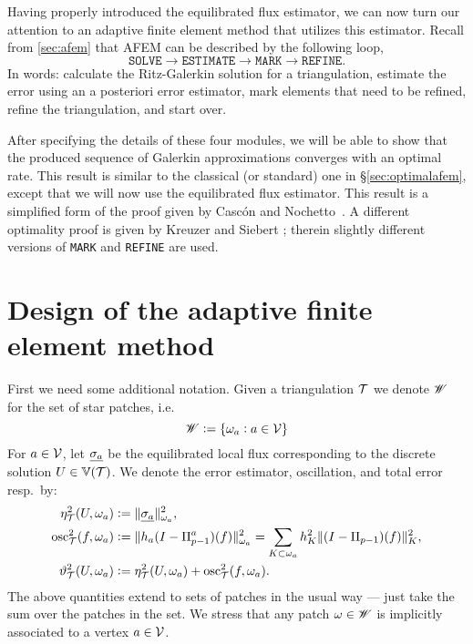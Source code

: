 \documentclass[thesis.tex]{subfiles}
\begin{document}
Having properly introduced the equilibrated flux estimator, we can now turn our attention
to an adaptive finite element method that utilizes this estimator.
Recall from \ref{sec:afem} that AFEM can be described by the following loop,
\[
  \texttt{SOLVE} \to \texttt{ESTIMATE} \to \texttt{MARK} \to \texttt{REFINE}.
\]
In words: calculate the Ritz-Galerkin solution for a triangulation, estimate
the error using an a posteriori error estimator, mark elements that need to be refined, refine
the triangulation, and start over. 

After specifying the details of these four modules, we will be able to show that the produced
sequence of Galerkin approximations converges with an optimal rate. This result
is similar to the classical (or standard) one in \S\ref{sec:optimalafem}, except that we will now use the equilibrated flux estimator. This
result is a simplified form of the proof given by Casc\'on and Nochetto~\cite{cascon2012}.
A different optimality proof is given by Kreuzer and Siebert \cite{kreuzersiebert}; therein
slightly different versions of \texttt{MARK} and \texttt{REFINE} are used.

\section{Design of the adaptive finite element method}
First we need some additional notation. Given a triangulation $\mathcal{T}$ we denote $\mathscr{W}$ for the set of star patches, i.e.~
\[
  \mathscr{W} := \set{\omega_a : a \in \mathcal{V}}
\]
For $a \in \mathcal{V}$, let $\underline{\sigma_a}$ be the equilibrated local flux corresponding to the discrete solution $U \in \mathbb{V}(\mathcal{T})$. We denote the
  error estimator, oscillation, and total error resp.~by:
\begin{align*}
  \eta^2_{\mathcal{T}}(U, \omega_a) &:= \| \underline{\sigma_a} \|^2_{\omega_a}, \\
  \operatorname{osc}^2_{\mathcal{T}}(f, \omega_a) &:= \| h_a(I - \Pi_{p-1}^a)(f) \|_{\omega_a}^2 = \sum_{K \subset \omega_a} h_K^2 \| (I - \Pi_{p-1})(f) \|^2_K,\\
  \vartheta^2_{\mathcal{T}}(U, \omega_a) &:= \eta^2_{\mathcal{T}}(U, \omega_a) + \operatorname{osc}^2_{\mathcal{T}}(f, \omega_a).
\end{align*}
The above quantities extend to sets of patches in the usual way 
--- just take the sum over the patches in the set.
We stress that any patch $\omega \in \mathscr{W}$ is implicitly associated to a vertex $a \in \mathcal{V}$.
\end{document}
